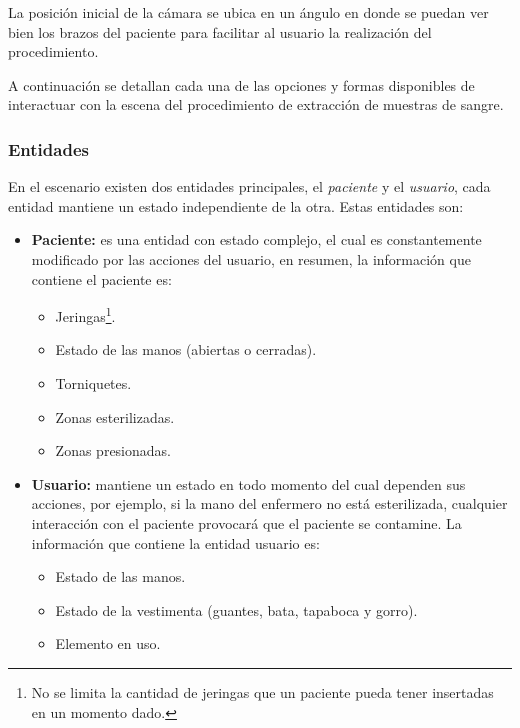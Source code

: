 La posición inicial de la cámara se ubica en un ángulo en donde se puedan ver 
bien los brazos del paciente para facilitar al usuario la realización del 
procedimiento.

A continuación se detallan cada una de las opciones y formas disponibles de
interactuar con la escena del procedimiento de extracción de muestras de sangre.


\subsubsection{Entidades}

En el escenario existen dos entidades principales, el \emph{paciente} y el
\emph{usuario}, cada entidad mantiene un estado independiente de la otra. Estas
entidades son:

\begin{itemize}

\item \textbf{Paciente:} es una entidad con estado complejo, el cual es
    constantemente modificado por las acciones del usuario, en resumen, la
    información que contiene el paciente es:
    \begin{itemize}
        \item Jeringas\footnote{No se limita la cantidad de jeringas que un
                paciente pueda tener insertadas en un momento dado.}.
        \item Estado de las manos (abiertas o cerradas).
        \item Torniquetes.
        \item Zonas esterilizadas.
        \item Zonas presionadas.
    \end{itemize}

\item \textbf{Usuario:} mantiene un estado en todo momento del cual dependen sus
    acciones, por ejemplo, si la mano del enfermero no está esterilizada,
    cualquier interacción con el paciente provocará que el paciente se
    contamine. La información que contiene la entidad usuario es:

    \begin{itemize}
    \item Estado de las manos.
    \item Estado de la vestimenta (guantes, bata, tapaboca y gorro).
    \item Elemento en uso.
    \end{itemize}
\end{itemize}

